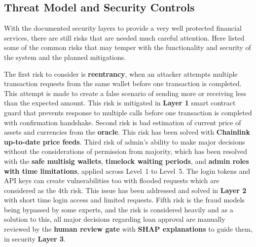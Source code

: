 \subsection{Threat Model and Security Controls}
\label{sec:threat-model}

With the documented security layers to provide a very well protected financial services, there are still risks that are needed much careful attention. Here listed some of the common risks that may temper with the functionality and security of the system and the planned mitigations.

The first risk to consider is \textbf{reentrancy}, when an attacker attempts multiple transaction requests from the same wallet before one transaction is completed. This attempt is made to create a false scenario of sending more or receiving less than the expected amount. This risk is mitigated in \textbf{Layer 1} smart contract guard that prevents response to multiple calls before one transaction is completed with confirmation handshake. Second risk is bad estimation of current price of assets and currencies from the \textbf{oracle}. This risk has been solved with \textbf{Chainlink up-to-date price feeds}. Third risk of admin's ability to make major decisions without the considerations of permission from majority, which has been resolved with the \textbf{safe multisig wallets}, \textbf{timelock waiting periods}, and \textbf{admin roles with time limitations}, applied across Level~1 to Level~5. The login tokens and API keys can create vulnerabilities too with flooded requests which are considered as the 4th risk. This issue has been addressed and solved in \textbf{Layer 2} with short time login access and limited requests. Fifth risk is the fraud models being bypassed by some experts, and the risk is considered heavily and as a solution to this, all major decisions regarding loan approval are manually reviewed by the \textbf{human review gate} with \textbf{SHAP explanations} to guide them, in security \textbf{Layer 3}.

